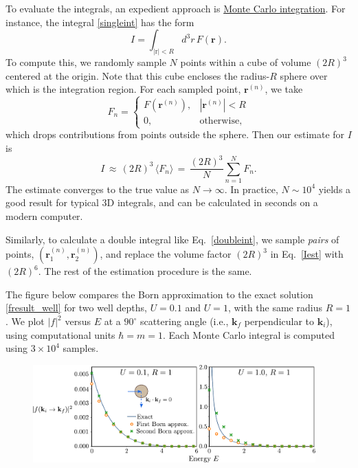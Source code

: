 \documentclass[prx,12pt]{revtex4-2}
\begin{document}
To evaluate the integrals, an expedient approach is
\href{https://en.wikipedia.org/wiki/Monte_Carlo_integration}{Monte
  Carlo integration}.  For instance, the integral \eqref{singleint}
has the form
\begin{equation}
  I = \int_{|\mathrm{r}|<R} d^3r \, F(\mathbf{r}).
\end{equation}
To compute this, we randomly sample $N$ points within a cube of volume
$(2R)^3$ centered at the origin.  Note that this cube encloses the
radius-$R$ sphere over which is the integration region.  For each
sampled point, $\mathbf{r}^{(n)}$, we take
\begin{equation}
  F_n = \begin{cases}F(\mathbf{r}^{(n)}), & |\mathbf{r}^{(n)}| < R \\ 0, &\mathrm{otherwise},\end{cases}
\end{equation}
which drops contributions from points outside the sphere.  Then our
estimate for $I$ is
\begin{equation}
  I \,\approx\, (2R)^3 \, \langle F_n\rangle \,=\, \frac{(2R)^3}{N} \sum_{n=1}^N F_n.
  \label{Iest}
\end{equation}
The estimate converges to the true value as $N\rightarrow\infty$.  In
practice, $N \sim 10^4$ yields a good result for typical 3D integrals,
and can be calculated in seconds on a modern computer.

Similarly, to calculate a double integral like Eq.~\eqref{doubleint},
we sample \textit{pairs} of points, $(\mathbf{r}_1^{(n)},
\mathbf{r}_2^{(n)})$, and replace the volume factor $(2R)^3$ in
Eq.~\eqref{Iest} with $(2R)^6$.  The rest of the estimation procedure
is the same.

The figure below compares the Born approximation to the exact solution
\eqref{fresult_well} for two well depths, $U = 0.1$ and $U = 1$, with
the same radius $R = 1$.  We plot $|f|^2$ versus $E$ at a $90^\circ$
scattering angle (i.e., $\mathbf{k}_f$ perpendicular to
$\mathbf{k}_i$), using computational units $\hbar = m = 1$.  Each
Monte Carlo integral is computed using $3\times10^4$ samples.

\begin{figure}[h]
  \centering\includegraphics[width=0.97\textwidth]{spherical_well_scattering}
\end{figure}
\end{document}
